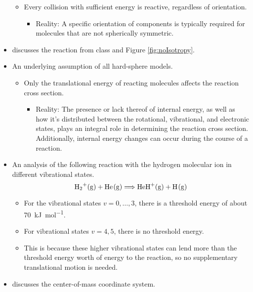 \documentclass[../notes.tex]{subfiles}
\begin{document}
\begin{itemize}
\begin{itemize}
        \item Every collision with sufficient energy is reactive, regardless of orientation.
        \begin{itemize}
            \item Reality: A specific orientation of components is typically required for molecules that are not spherically symmetric.
        \end{itemize}
    \end{itemize}
    \item \textcite{bib:McQuarrieSimon} discusses the  reaction from class and Figure \ref{fig:noIsotropy}.
    \item An underlying assumption of all hard-sphere models.
    \begin{itemize}
        \item Only the translational energy of reacting molecules affects the reaction cross section.
        \begin{itemize}
            \item Reality: The presence or lack thereof of internal energy, as well as how it's distributed between the rotational, vibrational, and electronic states, plays an integral role in determining the reaction cross section. Additionally, internal energy changes can occur during the course of a reaction. 
        \end{itemize}
    \end{itemize}
    \item An analysis of the following reaction with the hydrogen molecular ion in different vibrational states.
    \begin{equation*}
        \ce{H2+(g) + He(g)} \Longrightarrow \ce{HeH+(g) + H(g)}
    \end{equation*}
    \begin{itemize}
        \item For the vibrational states $v=0,\dots,3$, there is a threshold energy of about \SI{70}{\kilo\joule\per\mole}.
        \item For vibrational states $v=4,5$, there is no threshold energy.
        \item This is because these higher vibrational states can lend more than the threshold energy worth of energy to the reaction, so no supplementary translational motion is needed.
    \end{itemize}
    \item \textcite{bib:McQuarrieSimon} discusses the center-of-mass coordinate system.
    \begin{itemize}

\end{itemize}
\end{itemize}
\end{document}
